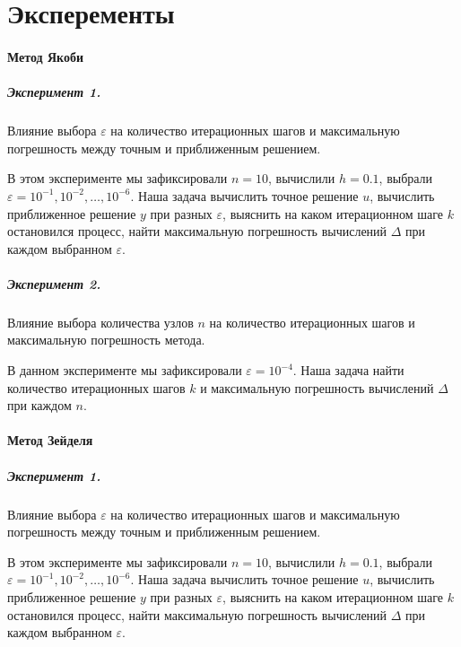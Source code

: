 \section{Эксперементы}

\paragraph{Метод Якоби}

\subparagraph{Эксперимент 1.}

Влияние выбора $\varepsilon$ на количество итерационных шагов и максимальную погрешность между точным и приближенным решением.

В этом эксперименте мы зафиксировали $n = 10$, вычислили $h=0.1$, выбрали $\varepsilon = 10^{-1}, 10^{-2}, \dots, 10^{-6}$. Наша задача вычислить точное решение $u$, вычислить приближенное решение $y$ при разных $\varepsilon$, выяснить на каком итерационном шаге $k$  остановился процесс, найти максимальную погрешность вычислений $\Delta$ при каждом выбранном $\varepsilon$.



\subparagraph{Эксперимент 2.}

Влияние выбора количества узлов $n$ на количество итерационных шагов и максимальную погрешность метода.

В данном эксперименте мы зафиксировали $\varepsilon = 10^{-4}$. Наша задача найти количество итерационных шагов $k$ и максимальную погрешность вычислений $\Delta$ при каждом $n$.



\newpage
\paragraph{Метод Зейделя}

\subparagraph{Эксперимент 1.}

Влияние выбора $\varepsilon$ на количество итерационных шагов и максимальную погрешность между точным и приближенным решением.

В этом эксперименте мы зафиксировали $n = 10$, вычислили $h=0.1$, выбрали $\varepsilon = 10^{-1}, 10^{-2}, \dots, 10^{-6}$. Наша задача вычислить точное решение $u$, вычислить приближенное решение $y$ при разных $\varepsilon$, выяснить на каком итерационном шаге $k$  остановился процесс, найти максимальную погрешность вычислений $\Delta$ при каждом выбранном $\varepsilon$.



